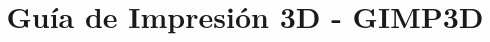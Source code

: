 \documentclass[a4paper,10pt]{report}
\title{Guía de Impresión 3D - GIMP3D}
\author{}
\begin{document}
\maketitle
\tableofcontents

\begin{abstract}
\end{abstract}





\end{document}
